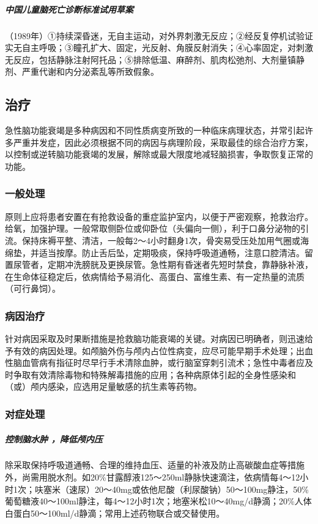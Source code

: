 \subparagraph{中国儿童脑死亡诊断标准试用草案}

（1989年）①持续深昏迷，无自主运动，对外界刺激无反应；②经反复停机试验证实无自主呼吸；③瞳孔扩大、固定，光反射、角膜反射消失；④心率固定，对刺激无反应，包括静脉注射阿托品；⑤排除低温、麻醉剂、肌肉松弛剂、大剂量镇静剂、严重代谢和内分泌紊乱等所致假象。

\subsection{治疗}

急性脑功能衰竭是多种病因和不同性质病变所致的一种临床病理状态，并常引起许多严重并发症，因此必须根据不同的病因与病理阶段，采取最佳的综合治疗方案，以控制或逆转脑功能衰竭的发展，解除或最大限度地减轻脑损害，争取恢复正常的功能。

\subsubsection{一般处理}

原则上应将患者安置在有抢救设备的重症监护室内，以便于严密观察，抢救治疗。给氧，加强护理。一般常取侧卧位或仰卧位（头偏向一侧），利于口鼻分泌物的引流。保持床褥平整、清洁，一般每2～4小时翻身1次，骨突易受压处加用气圈或海绵垫，并适当按摩。防止舌后坠，定期吸痰，保持呼吸道通畅，注意口腔清洁。留置尿管者，定期冲洗膀胱及更换尿管。急性期有昏迷者先短时禁食，靠静脉补液，在生命体征稳定后，依病情给予易消化、高蛋白、富维生素、有一定热量的流质（可行鼻饲）。

\subsubsection{病因治疗}

针对病因采取及时果断措施是抢救脑功能衰竭的关键。对病因已明确者，则迅速给予有效的病因处理。如颅脑外伤与颅内占位性病变，应尽可能早期手术处理；出血性脑血管病有指征时尽早行手术清除血肿，或行脑室穿刺引流术；急性中毒者应及时争取有效清除毒物和特殊解毒措施的应用；各种病原体引起的全身性感染和（或）颅内感染，应选用足量敏感的抗生素等药物。

\subsubsection{对症处理}

\subparagraph{控制脑水肿 ，降低颅内压}

除采取保持呼吸道通畅、合理的维持血压、适量的补液及防止高碳酸血症等措施外，尚需用脱水剂。如20\%甘露醇液125～250ml静脉快速滴注，依病情每4～12小时1次；呋塞米（速尿）20～40mg或依他尼酸（利尿酸钠）50～100mg静注，50\%葡萄糖液40～100ml静注，每4～12小时1次；地塞米松10～40mg/d静滴；20\%人体白蛋白50～100ml/d静滴；常用上述药物联合或交替使用。

